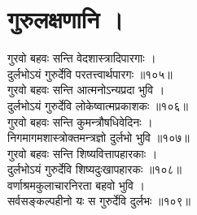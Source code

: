 \section{गुरुलक्षणानि ।}

गुरवो बहवः सन्ति वेदशास्त्रादिपारगाः ।\\[-2mm]
दुर्लभोऽयं गुरुर्देवि परतत्त्वार्थपारगः ॥१०५॥\\
गुरवो बहवः सन्ति आत्मनोऽन्यप्रदा भुवि ।\\[-2mm]
दुर्लभोऽयं गुरुर्देवि लोकेष्वात्मप्रकाशकः ॥१०६॥\\
गुरवो बहवः सन्ति कुमन्त्रौषधिवेदिनः ।\\[-2mm]
निगमागमशास्त्रोक्तमन्त्रज्ञो  दुर्लभो भुवि ॥१०७॥\\
गुरवो बहवः सन्ति शिष्यवित्तापहारकाः ।\\[-2mm]
दुर्लभोऽयं गुरुर्देवि शिष्यदुःखापहारकः ॥१०८॥\\
वर्णाश्रमकुलाचारनिरता बहवो भुवि ।\\[-2mm]
सर्वसङ्कल्पहीनो यः स गुरुर्देवि दुर्लभः ॥१०९॥\\

